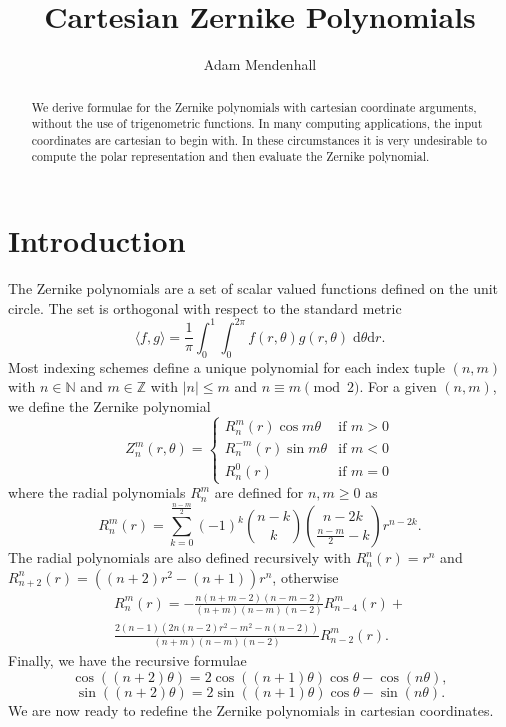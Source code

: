 \documentclass[twocolumn,showpacs,%
  nofootinbib,aps,superscriptaddress,%
  eqsecnum,prd,notitlepage,showkeys,10pt]{article}
\begin{document}
\title{Cartesian Zernike Polynomials}
\author{Adam Mendenhall}

\begin{abstract}
We derive formulae for the Zernike polynomials with cartesian coordinate arguments, without the use of trigenometric functions.  In many computing applications, the input coordinates are cartesian to begin with.  In these circumstances it is very undesirable to compute the polar representation and then evaluate the Zernike polynomial.
\end{abstract}

\maketitle

\section{Introduction}
\label{sec:intro}

The Zernike polynomials are a set of scalar valued functions defined on the unit circle.  The set is orthogonal with respect to the standard metric
\[\langle f,g\rangle=\frac1\pi\int_0^1\int_0^{2\pi}f(r,\theta)g(r,\theta)\;\mathrm d\theta\mathrm dr.\]
Most indexing schemes define a unique polynomial for each index tuple $(n,m)$ with $n\in\mathbb N$ and $m\in\mathbb Z$ with $|n|\leq m$ and $n\equiv m\pmod2$.  For a given $(n,m)$, we define the Zernike polynomial
\[Z_n^m(r,\theta)=\left\{\begin{array}{cl}R_n^m(r)\cos m\theta&\text{if }m>0\\R_n^{-m}(r)\sin m\theta&\text{if }m<0\\R_n^0(r)&\text{if }m=0\end{array}\right.\]
where the radial polynomials $R_n^m$ are defined for $n,m\geq0$ as 
\[R_n^m(r)=\sum_{k=0}^{\frac{n-m}2}(-1)^k\binom{n-k}k\binom{n-2k}{\frac{n-m}2-k}r^{n-2k}.\]
The radial polynomials are also defined recursively with $R_n^n(r)=r^n$ and $R_{n+2}^n(r)=\left((n+2)r^2-(n+1)\right)r^n$, otherwise
\begin{multline*}
R_n^m(r)=-\frac{n(n+m-2)(n-m-2)}{(n+m)(n-m)(n-2)}R_{n-4}^m(r)+\\
\frac{2(n-1)(2n(n-2)r^2-m^2-n(n-2))}{(n+m)(n-m)(n-2)}R_{n-2}^m(r).
\end{multline*}
Finally, we have the recursive formulae
\[\cos((n+2)\theta)=2\cos((n+1)\theta)\cos\theta-\cos(n\theta),\]
\[\sin((n+2)\theta)=2\sin((n+1)\theta)\cos\theta-\sin(n\theta).\]
We are now ready to redefine the Zernike polynomials in cartesian coordinates.
\end{document}
